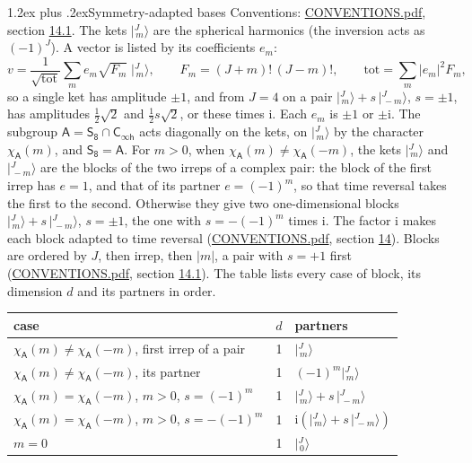 \documentclass[10pt,a4paper]{article}
\makeatletter
\renewcommand\section{\@startsection{section}{1}{\z@}{-3ex plus -1ex minus -.2ex}%
  {1.2ex plus .2ex}{\normalfont\large\sffamily\bfseries\color{parttitle}}}
\numberwithin{equation}{section}
\newcommand{\grp}[1]{\mathsf{#1}}
\newcommand{\iunit}{\mathrm{i}}
\newcommand{\chiA}{\chi_{\grp{A}}}
\newcommand{\jm}[2]{\bigl\lvert{}^{#1}_{\,#2}\bigr\rangle}
\makeatother
\begin{document}
\section{Symmetry-adapted bases}\label{s:bases}
Conventions: \href{../../CONVENTIONS.pdf}{CONVENTIONS.pdf}, section \href{../../CONVENTIONS.pdf\#conv.14.1}{14.1}.
\leavevmode\label{n:index.m}\label{n:vector.ket}The kets $\jm{J}{m}$ are the spherical harmonics (the inversion acts as $(-1)^J$). \label{n:index.ketcoefficient}\label{n:vector.basis.symmetry}\label{n:index.ketweight}\label{n:index.total}A vector is listed by its coefficients $e_m$:
\begin{equation}\label{e:ket}v = \frac{1}{\sqrt{\mathrm{tot}}}\sum_m e_m\sqrt{F_m}\;\jm{J}{m},\qquad F_m = (J+m)!\,(J-m)!,\qquad \mathrm{tot} = \sum_m |e_m|^2F_m,\end{equation}
\leavevmode\label{n:index.pair.sign}so a single ket has amplitude $\pm1$, and from $J = 4$ on a pair $\jm{J}{m} + s\,\jm{J}{-m}$, $s = \pm1$, has amplitudes $\tfrac{1}{2}\sqrt{2}$ and $\tfrac{1}{2}s\sqrt{2}$, or these times $\iunit$. Each $e_m$ is $\pm1$ or $\pm\iunit$.
\leavevmode\label{n:group.A}\label{n:function.character.abelian}The subgroup $\grp{A} = \grp{S_{8}}\cap\grp{C_{\infty h}}$ acts diagonally on the kets, on $\jm{J}{m}$ by the character $\chiA(m)$, and $\grp{S_{8}} = \grp{A}$. For $m > 0$, when $\chiA(m) \ne \chiA(-m)$, the kets $\jm{J}{m}$ and $\jm{J}{-m}$ are the blocks of the two irreps of a complex pair: the block of the first irrep has $e = 1$, and that of its partner $e = (-1)^m$, so that time reversal takes the first to the second. Otherwise they give two one-dimensional blocks $\jm{J}{m} + s\,\jm{J}{-m}$, $s = \pm1$, the one with $s = -(-1)^m$ times $\iunit$. The factor $\iunit$ makes each block adapted to time reversal (\href{../../CONVENTIONS.pdf}{CONVENTIONS.pdf}, section \href{../../CONVENTIONS.pdf\#conv.14}{14}). Blocks are ordered by $J$, then irrep, then $|m|$, a pair with $s = +1$ first (\href{../../CONVENTIONS.pdf}{CONVENTIONS.pdf}, section \href{../../CONVENTIONS.pdf\#conv.14.1}{14.1}).
\leavevmode\label{n:head.case}\label{n:head.partners}The table lists every case of block, its dimension $d$ and its partners in order.
\begin{center}\begin{tabular}{@{}lrl@{}}\toprule
case & $d$ & partners\\\midrule
$\chiA(m) \ne \chiA(-m)$, first irrep of a pair & 1 & $\jm{J}{m}$\\
$\chiA(m) \ne \chiA(-m)$, its partner & 1 & $(-1)^m\jm{J}{m}$\\
$\chiA(m) = \chiA(-m)$, $m > 0$, $s = (-1)^m$ & 1 & $\jm{J}{m} + s\,\jm{J}{-m}$\\
$\chiA(m) = \chiA(-m)$, $m > 0$, $s = -(-1)^m$ & 1 & $\iunit(\jm{J}{m} + s\,\jm{J}{-m})$\\
$m = 0$ & 1 & $\jm{J}{0}$\\
\bottomrule\end{tabular}\end{center}
\end{document}
